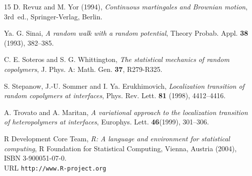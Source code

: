 \documentclass[reqno,11pt]{amsart}
\numberwithin{equation}{section}
\begin{document}
\begin{thebibliography}{15}
 D. Revuz and M. Yor (1994), \emph{Continuous martingales and Brownian motion}, 3rd~ed., Springer-Verlag, Berlin.

Ya. G. Sinai, \textit{A
random walk with a random potential},  Theory Probab. Appl. {\bf 38} (1993),  382--385.

  C. E. Soteros and S. G. Whittington, \textit{The statistical mechanics of random copolymers}, J. Phys. A: Math. Gen. {\bf 37}, R279-R325.



S. Stepanow,  J.-U. Sommer and   I. Ya. Erukhimovich,
\textit{Localization transition of random copolymers at interfaces},
 Phys. Rev. Lett. {\bf 81} (1998), 4412--4416.

  A. Trovato  and A. Maritan,
\textit{A variational approach to the localization transition of heteropolymers at interfaces},
Europhys. Lett. {\bf 46}(1999), 301--306.

R Development Core Team, \textit{R: A language and environment for statistical
  computing}, R Foundation for Statistical Computing, Vienna, Austria (2004), ISBN
  3-900051-07-0.\\ URL {\tt http://www.R-project.org}

\end{thebibliography}
\end{document}
